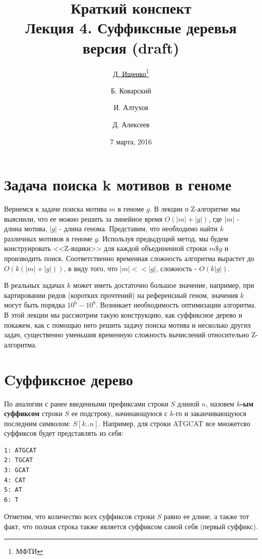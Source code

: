 \documentclass[letterpaper, 11pt]{article}
\title{\large{Краткий конспект}\\
\LARGE{Лекция 4. Суффиксные деревья}\\
\normalsize версия \versionnumber (\textcolor{NavyBlue}{draft})}
\date{7 марта, 2016}
\author{\underline{Д. Ищенко\thanks{МФТИ}} \and Б. Коварский\footnotemark[1]
\and И. Алтухов\footnotemark[1] \and Д. Алексеев\footnotemark[1]}
\begin{document}
\maketitle
\thispagestyle{empty}
\clearpage

\section{Задача поиска k мотивов в геноме}

Вернемся к задаче поиска мотива $m$ в геноме $g$. В лекции о Z-алгоритме мы выяснили, что ее можно решить за линейное время $O(|m| + |g|)$, где $|m|$ - длина мотива, $|g|$ - длина генома. Представим, что необходимо найти $k$ различных мотивов в геноме $g$. Используя предыдущий метод, мы будем конструировать <<Z-ящики>> для каждой объединенной строки $m\$g$ и производить поиск. Соответственно временная сложность алгоритма вырастет до $O(k(|m| + |g|))$, в виду того, что $|m| << |g|$, сложность - $O(k|g|)$.

В реальных задачах $k$ может иметь достаточно большое значение, например, при картировании ридов (коротких прочтений) на референсный геном, значения $k$ могут быть порядка $10^6 - 10^8$. Возникает необходимость оптимизации алгоритма. В этой лекции мы рассмотрим такую конструкцию, как суффиксное дерево и покажем, как с помощью него решить задачу поиска мотива и несколько других задач, существенно уменьшив временную сложность вычислений относительно Z-алгоритма.

\section{Cуффиксное дерево}

По аналогии с ранее введенными префиксами строки $S$ длиной $n$, назовем \textbf{$k$-ым суффиксом} строки $S$ ее подстроку, начинающуюся с $k$-го и заканчивающуюся последним символом: $S[k..n]$. Например, для строки ATGCAT все множетсво суффиксов будет представлять из себя:
\begin{verbatim}
1: ATGCAT
2: TGCAT
3: GCAT
4: CAT
5: AT
6: T
\end{verbatim}

Отметим, что количество всех суффиксов строки $S$ равно ее длине, а также тот факт, что полная строка также является суффиксом самой себя (первый суффикс).
\end{document}
